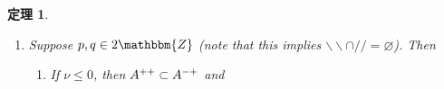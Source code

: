 \documentclass[12pt]{msjproc} %
\newcommand{\tmop}[1]{\ensuremath{\operatorname{#1}}}
\newtheorem{theorem}{定理}
\begin{document}
\begin{versiona}
\begin{theorem}
\begin{enumerate}
\begin{enumerate}
      \
      
      \item If $\nu > p + q - 3$, then $A^{- -} \supset A^{- +}$ and
      
      \
      
      \begin{center}
        \begin{center}
          \begin{center}
            \begin{center}
              \begin{tabular}{|c|c|c|}
                \hline
                & $\nu \in 2\mathbbm{Z}$ & $\nu \in 2\mathbbm{Z}+ 1$\\
                \hline
                $(/ / \cup \backslash\backslash)^c$ & $A^{\noplus + -}$ &
                $\tmop{full}$\\
                \hline
                $\backslash\backslash - / /$ & $A^{+ -}$ & $A^{- +}$\\
                \hline
                $/ / -\backslash\backslash$ & $\varnothing$ & $\tmop{full}$\\
                \hline
              \end{tabular}
            \end{center}
          \end{center}
        \end{center}
      \end{center}
      
      \ 
    \end{enumerate}
    \item Suppose $p, q \in 2\mathbbm{Z}$ (note that this implies
    $\backslash\backslash \cap / / = \varnothing$). Then
    \begin{enumerate}
      \item If $\nu \leqslant 0$, then $A^{ + +} \subset A^{- +}$ and
      

\end{enumerate}
\end{enumerate}
\end{theorem}
\end{versiona}
\end{document}
